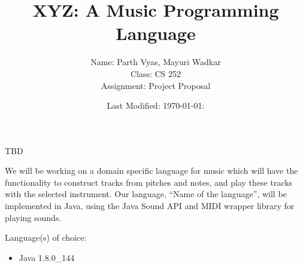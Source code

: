 \documentclass{article}
\title{XYZ: A Music Programming Language}
\author {
  Name:  Parth Vyas, Mayuri Wadkar\\
  Class: CS 252 \\
  Assignment: Project Proposal \\
}
\date{Last Modified: {\today}:{\currenttime}}
\begin{document}
    \maketitle

    \begin{flushleft}
    {
     	TBD
    }  
    \end{flushleft}

    \begin{flushleft}
      {
        We will be working on a domain specific language for music which will have the functionality to construct tracks from pitches and notes, and play these tracks with the selected instrument. Our language, “Name of the language”, will be implemented in Java, using the Java Sound API and MIDI wrapper library for playing sounds. 
        
        Language(s) of choice:
        \begin{itemize}
          \item Java 1.8.0\_144
         
        \end{itemize}
      }
    \end{flushleft}
    {
      \newcommand{\schedule}[2]{
        \hline
        #1 & #2
        \\
        \hline
      }

      \begin{center}
        \begin{table}[!th]
        \end{table}  
      \end{center}
    }

    \nocite{SJonesBeautifulConcc}
    {}
    
\end{document}
